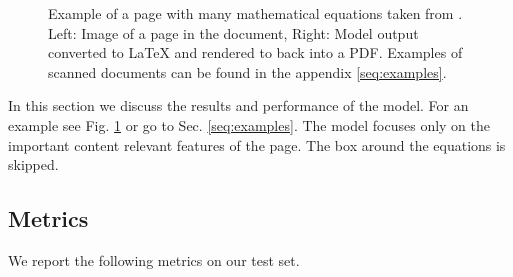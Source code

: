\documentclass[]{article}
\begin{document}
\begin{figure}[ht]
\begin{subfigure}[b]{0.45\textwidth}
     \end{subfigure}
    \caption{Example of a page with many mathematical equations taken from \cite{sorscher_beyond_2022}. Left: Image of a page in the document, Right: Model output converted to LaTeX and rendered to back into a PDF. Examples of scanned documents can be found in the appendix \ref{seq:examples}.}
    \label{fig:example_theoretical}
\end{figure}

In this section we discuss the results and performance of the model. For an example see Fig. \ref{fig:example_theoretical} or go to Sec. \ref{seq:examples}. The model focuses only on the important content relevant features of the page. The box around the equations is skipped.
\subsection{Metrics}
We report the following metrics on our test set.
\end{document}
